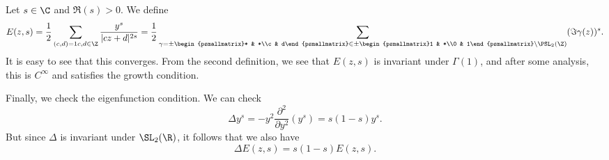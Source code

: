 \documentclass[a4paper]{article}
\begin{document}
\begin{eg}
  Let $s \in \C$ and $\Re(s) > 0$. We define
  \[
    E(z, s) = \frac{1}{2} \sum_{\substack{(c, d) = 1}{c, d \in \Z}} \frac{y^s}{|cz + d|^{2s}} = \frac{1}{2} \sum_{\gamma = \pm \begin{psmallmatrix}* & *\\c & d\end{psmallmatrix} \in \pm \begin{psmallmatrix}1 & *\\0 & 1\end{psmallmatrix} \backslash \PSL_2(\Z)} (\Im \gamma(z))^s.
  \]
  It is easy to see that this converges. From the second definition, we see that $E(z, s)$ is invariant under $\Gamma(1)$, and after some analysis, this is $C^\infty$ and satisfies the growth condition.

  Finally, we check the eigenfunction condition. We can check
  \[
    \Delta y^s = -y^2 \frac{\partial^2}{\partial y^2} (y^s) = s(1 - s) y^s.
  \]
  But since $\Delta$ is invariant under $\SL_2(\R)$, it follows that we also have
  \[
    \Delta E(z, s) = s(1 - s) E(z, s).
  \]
\end{eg}
\printindex
\end{document}
